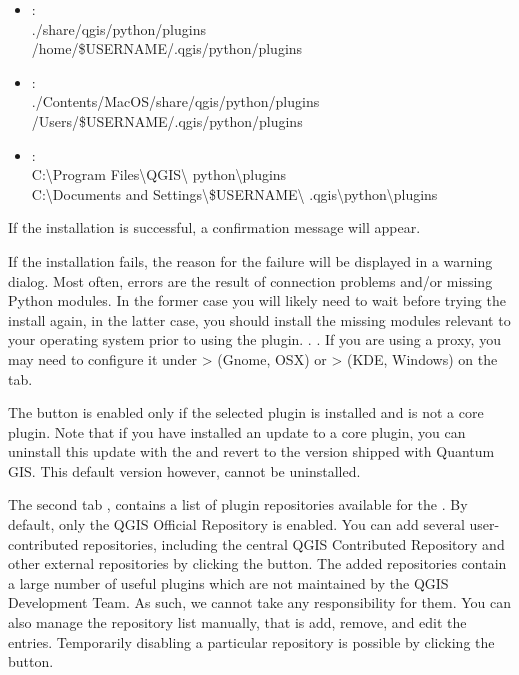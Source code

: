 \begin{itemize}[label=--]
\item {}:\\
./share/qgis/python/plugins \\
/home/\$USERNAME/.qgis/python/plugins
\item {}:\\
./Contents/MacOS/share/qgis/python/plugins \\
/Users/\$USERNAME/.qgis/python/plugins
\item {}:\\
C:\textbackslash Program Files\textbackslash QGIS\textbackslash
python\textbackslash plugins \\
C:\textbackslash Documents and Settings\textbackslash\$USERNAME\textbackslash
.qgis\textbackslash python\textbackslash plugins
\end{itemize}

If the installation is successful, a confirmation message will appear.

If the installation fails, the reason for the failure will be displayed 
in a warning dialog. Most often, errors are the result of connection problems 
and/or missing Python modules. In the former case you will likely need to 
wait before trying the install again, in the latter case, you should install 
the missing modules relevant to your operating system prior to using the 
plugin. . . If you are using a proxy, you may need to configure it under 
 >  (Gnome, OSX) 
or  >  (KDE, Windows) 
on the  tab.

The  button is enabled only if the selected plugin is installed and is not a core plugin. Note that if you have installed an update to a core plugin, you can uninstall this update with the  and revert to the version shipped with Quantum GIS. This default version however, cannot be uninstalled.


The second tab , contains a list of plugin repositories available for the . By default, only the QGIS Official Repository is enabled. You can add several user-contributed repositories, including the central QGIS Contributed Repository and other external repositories by clicking the  button. The added repositories contain a large number of useful plugins which are not maintained by the QGIS Development Team. As such, we cannot take any responsibility for them. You can also manage the repository list manually, that is add, remove, and edit the entries. Temporarily disabling a particular repository is possible by clicking the  button.

